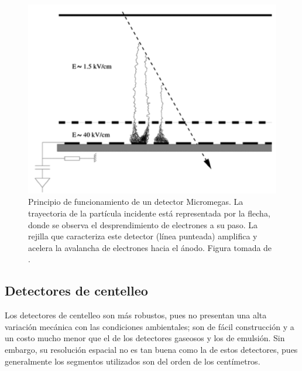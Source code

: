 \documentclass[12pt,oneside,openany,letter]{book}
\begin{document}
\begin{figure}
\begin{center}
\includegraphics[scale=0.7]{gaseoso.png}
\caption[Principio de funcionamiento de un detector de Micromegas]{Principio de funcionamiento de un detector Micromegas. La trayectoria de la part\'icula incidente est\'a representada por la flecha, donde se observa el desprendimiento de electrones a su paso. La rejilla que caracteriza este detector (l\'inea punteada) amplifica y acelera la avalancha de electrones hacia el \'anodo. Figura tomada de \cite{procureur2018muon}.}
\label{gaseoso}
\end{center}
\end{figure}

\subsection{Detectores de centelleo}
Los detectores de centelleo son m\'as robustos, pues no presentan una alta variaci\'on mec\'anica con las condiciones ambientales; son de f\'acil construcci\'on y a un costo mucho menor que el de los detectores gaseosos y los de emulsi\'on. Sin embargo, su resoluci\'on espacial no es tan buena como la de estos detectores, pues generalmente los segmentos utilizados son del orden de los cent\'imetros. 
\end{document}
